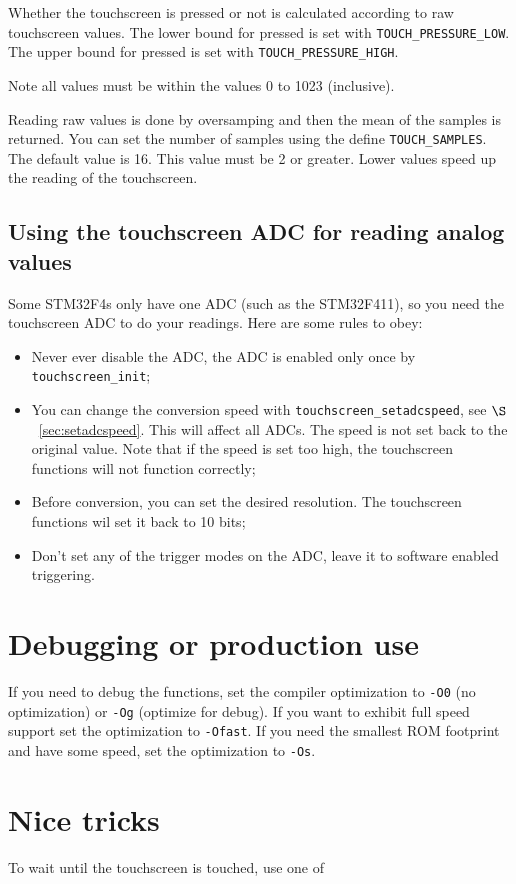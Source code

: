 \documentclass[12pt]{article}
\begin{document}
Whether the touchscreen is pressed or not is calculated according to raw touchscreen values. The lower bound for pressed is set with \lstinline|TOUCH_PRESSURE_LOW|. The upper bound for pressed is set with \lstinline|TOUCH_PRESSURE_HIGH|.

Note all values must be within the values 0 to 1023 (inclusive).

Reading raw values is done by oversamping and then the mean of the samples is returned. You can set the number of samples using the define \lstinline|TOUCH_SAMPLES|. The default value is 16. This value must be 2 or greater. Lower values speed up the reading of the touchscreen.

\subsection{Using the touchscreen ADC for reading analog values}
Some STM32F4s only have one ADC (such as the STM32F411), so you need the touchscreen ADC to do your readings. Here are some rules to obey:

\begin{itemize}
\item Never ever disable the ADC, the ADC is enabled only once by \lstinline|touchscreen_init|;
\item You can change the conversion speed with \lstinline|touchscreen_setadcspeed|, see $\S$~\ref{sec:setadcspeed}. This will affect all ADCs. The speed is not set back to the original value. Note that if the speed is set too high, the touchscreen functions will not function correctly;
\item Before conversion, you can set the desired resolution. The touchscreen functions wil set it back to 10 bits;
\item Don't set any of the trigger modes on the ADC, leave it to software enabled triggering.
\end{itemize}


\section{Debugging or production use}
If you need to debug the functions, set the compiler optimization to \lstinline|-O0| (no optimization) or \lstinline|-Og| (optimize for debug). If you want to exhibit full speed support set the optimization to \lstinline|-Ofast|. If you need the smallest ROM footprint and have some speed, set the optimization to \lstinline|-Os|.


\section{Nice tricks}
To wait until the touchscreen is touched, use one of
\end{document}
